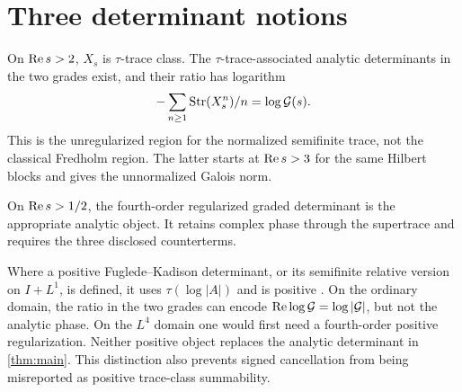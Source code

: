 \section{Three determinant notions}

On $\operatorname{Re} s>2$, $X_s$ is $\tau$-trace class.  The
$\tau$-trace-associated analytic determinants in the two grades exist, and
their ratio has logarithm
\[
 -\sum_{n\ge1}\operatorname{Str}(X_s^n)/n=\log\mathcal G(s).
\]
This is the unregularized region for the normalized semifinite trace, not the
classical Fredholm region.  The latter starts at $\operatorname{Re} s>3$ for the same
Hilbert blocks and gives the unnormalized Galois norm.

On $\operatorname{Re} s>1/2$, the fourth-order regularized graded determinant is the
appropriate analytic object.  It retains complex phase through the
supertrace and requires the three disclosed counterterms.

Where a positive Fuglede--Kadison determinant, or its semifinite relative
version on $I+L^1$, is defined, it uses $\tau(\log|A|)$ and is positive
\cite{FugledeKadison1952,DeLaHarpe2013,HochsKaadSchemaitat2018}.  On the
ordinary domain, the ratio in the two grades can encode
$\operatorname{Re}\log\mathcal G=\log|\mathcal G|$, but not the analytic phase.  On the
$L^4$ domain one would first need a fourth-order positive regularization.
Neither positive object replaces the analytic determinant in
\cref{thm:main}.  This distinction also prevents signed cancellation from
being misreported as positive trace-class summability.
